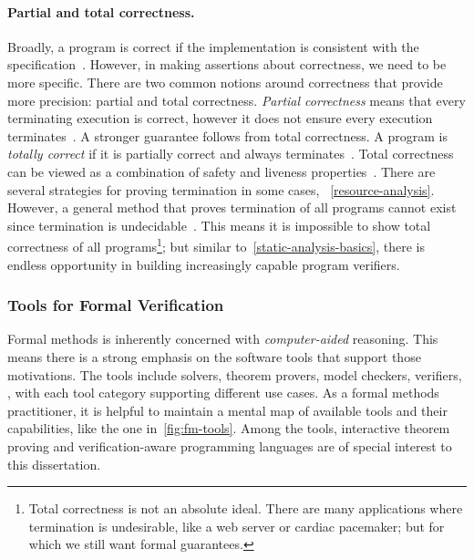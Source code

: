 \paragraph*{Partial and total correctness.}
Broadly, a program is correct if the implementation is consistent with the specification~\cite{furia2014b}.
However, in making assertions about correctness, we need to be more specific.
There are two common notions around correctness that provide more precision: partial and total correctness.
\emph{Partial correctness} means that every terminating execution is correct, however it does not ensure every execution terminates~\cite[p. 64]{leino2023}.
A stronger guarantee follows from total correctness.
A program is \emph{totally correct} if it is partially correct and always terminates~\cite[p. 64]{leino2023}.
Total correctness can be viewed as a combination of safety and liveness properties~\cite{lamport1977}.
There are several strategies for proving termination in some cases, \cf~\autoref{resource-analysis}.
However, a general method that proves termination of all programs cannot exist since termination is undecidable~\cite{turing1936}.
This means it is impossible to show total correctness of all programs\footnote{
Total correctness is not an absolute ideal.
There are many applications where termination is undesirable, like a web server or cardiac pacemaker; but for which we still want formal guarantees.};
but similar to~\autoref{static-analysis-basics},
there is endless opportunity in building increasingly capable program verifiers.

\subsubsection{Tools for Formal Verification}

Formal methods is inherently concerned with \emph{computer-aided} reasoning.
This means there is a strong emphasis on the software tools that support those motivations.
The tools include solvers, theorem provers, model checkers, verifiers, \etc, with each tool category supporting different use cases.
As a formal methods practitioner, it is helpful to maintain a mental map of available tools and their capabilities, like the one in~\autoref{fig:fm-tools}.
Among the tools, interactive theorem proving and verification-aware programming languages are of special interest to this dissertation.

